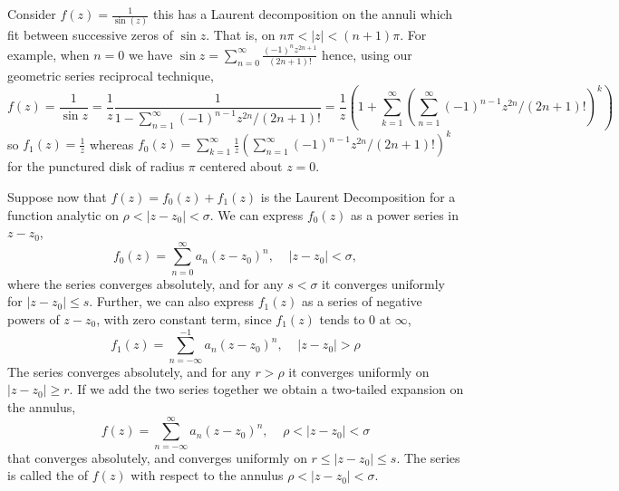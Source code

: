 \begin{example}
    Consider $f(z) = \frac{1}{\sin(z)}$ this has a Laurent decomposition on the annuli which fit between successive zeros of $\sin z$. That is, on $n\pi < |z| < (n+1)\pi$. For example, when $n = 0$ we have $\sin z = \sum_{n=0}^{\infty}\frac{(-1)^nz^{2n+1}}{(2n+1)!}$ hence, using our geometric series reciprocal technique, \begin{equation*}
        f(z) = \frac{1}{\sin z} = \frac{1}{z}\frac{1}{1-\sum_{n=1}^{\infty}(-1)^{n-1}z^{2n}/(2n+1)!} = \frac{1}{z}\left(1+\sum_{k=1}^{\infty}\left(\sum_{n=1}^{\infty}(-1)^{n-1}z^{2n}/(2n+1)!\right)^k\right)
    \end{equation*}
    so $f_1(z) = \frac{1}{z}$ whereas $f_0(z) = \sum_{k=1}^{\infty}\frac{1}{z}\left(\sum_{n=1}^{\infty}(-1)^{n-1}z^{2n}/(2n+1)!\right)^k$ for the punctured disk of radius $\pi$ centered about $z = 0$.
\end{example}

Suppose now that $f(z) = f_0(z)+f_1(z)$ is the Laurent Decomposition for a function analytic on $\rho < |z-z_0| < \sigma$. We can express $f_0(z)$ as a power series in $z-z_0$, \begin{equation*}
    f_0(z) = \sum_{n=0}^{\infty}a_n(z-z_0)^n,\;\;\;\;|z-z_0| < \sigma,
\end{equation*}
where the series converges absolutely, and for any $s < \sigma$ it converges uniformly for $|z-z_0| \leq s$. Further, we can also express $f_1(z)$ as a series of negative powers of $z-z_0$, with zero constant term, since $f_1(z)$ tends to $0$ at $\infty$, \begin{equation*}
    f_1(z) = \sum_{n=-\infty}^{-1}a_n(z-z_0)^n,\;\;\;\;|z-z_0| > \rho
\end{equation*}
The series converges absolutely, and for any $r > \rho$ it converges uniformly on $|z-z_0| \geq r$. If we add the two series together we obtain a two-tailed expansion on the annulus, \begin{equation*}
    f(z) = \sum_{n=-\infty}^{\infty}a_n(z-z_0)^n,\;\;\;\;\rho < |z-z_0| < \sigma
\end{equation*}
that converges absolutely, and converges uniformly on $r \leq |z-z_0| \leq s$. The series is called the  of $f(z)$ with respect to the annulus $\rho < |z-z_0| < \sigma$. 

